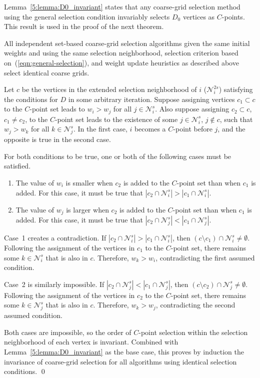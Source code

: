 \documentclass{elsart}
\newenvironment{proof}{\begin{pf}}{\qed\end{pf}}
\begin{document}
Lemma~\ref{5:lemma:D0_invariant} states that any coarse-grid selection
method using the general selection condition invariably selects $D_0$
vertices as $C$-points. This result is used in the proof of the next
theorem.

\begin{thm}
\label{5:theorem:invariance}
All independent set-based coarse-grid selection algorithms given the
same initial weights and using the same selection neighborhood,
selection criterion based on~(\ref{eqn:general-selection}), and weight
update heuristics as described above select identical coarse grids.
\end{thm}
\begin{proof}
Let $c$ be the vertices in the extended selection neighborhood of $i$
($\mathcal{N}_i^{2s}$) satisfying the conditions for $D$ in some
arbitrary iteration. Suppose assigning vertices $c_1 \subset c$ to the
$C$-point set leads to $w_i > w_j$ for all $j \in
\mathcal{N}_i^s$. Also suppose assigning $c_2 \subset c$, $c_1 \ne
c_2$, to the $C$-point set leads to the existence of some $j \in
\mathcal{N}_i^s$, $j \notin c$, such that $w_j > w_k$ for all $k \in
\mathcal{N}_j^s$. In the first case, $i$ becomes a $C$-point before
$j$, and the opposite is true in the second case.

For both conditions to be true, one or both of the following cases
must be satisfied.
\begin{enumerate}
\item The value of $w_i$ is smaller when $c_2$ is added to the
  $C$-point set than when $c_1$ is added. For this case, it must be
  true that $|c_2 \cap \mathcal{N}_i^s| > |c_1 \cap \mathcal{N}_i^s|$.
\item The value of $w_j$ is larger when $c_2$ is added to the
  $C$-point set than when $c_1$ is added. For this case, it must be
  true that $|c_2 \cap \mathcal{N}_j^s| < |c_1 \cap
  \mathcal{N}_j^s|$.
\end{enumerate}

Case~1 creates a contradiction. If $|c_2 \cap \mathcal{N}_i^s| > |c_1
\cap \mathcal{N}_i^s|$, then $(c \setminus c_1) \cap \mathcal{N}_i^s
\ne \emptyset$. Following the assignment of the vertices in $c_1$ to
the $C$-point set, there remains some $k \in \mathcal{N}_i^s$ that is
also in $c$. Therefore, $w_k > w_i$, contradicting the first assumed
condition.

Case~2 is similarly impossible. If $|c_2 \cap \mathcal{N}_j^s| < |c_1
\cap \mathcal{N}_j^s|$, then $(c \setminus c_2) \cap \mathcal{N}_j^s
\ne \emptyset$. Following the assignment of the vertices in $c_2$ to
the $C$-point set, there remains some $k \in \mathcal{N}_j^s$ that is
also in $c$. Therefore, $w_k > w_j$, contradicting the second assumed
condition.

Both cases are impossible, so the order of $C$-point selection within
the selection neighborhood of each vertex is invariant. Combined with
Lemma~\ref{5:lemma:D0_invariant} as the base case, this proves by
induction the invariance of coarse-grid selection for all algorithms
using identical selection conditions.
\end{proof}
\end{document}
